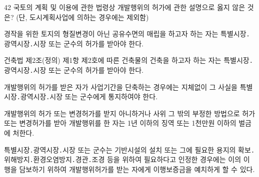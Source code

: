 \begin{question}{42}
국토의 계획 및 이용에 관한 법령상 개발행위의 허가에 관한 설명으로 옳지 않은 것은? (단, 도시계획사업에 의하는 경우에는 제외함)
\begin{choices}
  \item 경작을 위한 토지의 형질변경이 아닌 공유수면의 매립을 하고자 하는 자는 특별시장․광역시장․시장 또는 군수의 허가를 받아야 한다.
  \item 건축법 제2조(정의) 제1항 제2호에 따른 건축물의 건축을 하고자 하는 자는 특별시장․광역시장․시장 또는 군수의 허가를 받아야 한다.
  \item 개발행위의 허가를 받은 자가 사업기간을 단축하는 경우에는 지체없이 그 사실을 특별시장․광역시장․시장 또는 군수에게 통지하여야 한다.
  \item 개발행위의 허가 또는 변경허가를 받지 아니하거나 사위 그 밖의 부정한 방법으로 허가 또는 변경허가를 받아 개발행위를 한 자는 1년 이하의 징역 또는 1천만원 이하의 벌금에 처한다.
  \item 특별시장․광역시장․시장 또는 군수는 기반시설의 설치 또는 그에 필요한 용지의 확보․위해방지․환경오염방지․경관․조경 등을 위하여 필요하다고 인정한 경우에는 이의 이행을 담보하기 위하여 개발행위허가를 받는 자에게 이행보증금을 예치하게 할 수 있다.
\end{choices}
\end{question}
